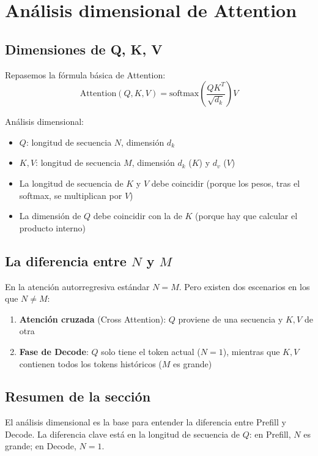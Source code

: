 \documentclass[a4paper]{article}
\begin{document}
\section{Análisis dimensional de Attention}

\subsection{Dimensiones de Q, K, V}

Repasemos la fórmula básica de Attention:
$$
\text{Attention}(Q, K, V) = \text{softmax}\left(\frac{QK^T}{\sqrt{d_k}}\right) V
$$

Análisis dimensional:
\begin{itemize}
  \item $Q$: longitud de secuencia $N$, dimensión $d_k$
  \item $K, V$: longitud de secuencia $M$, dimensión $d_k$ ($K$) y $d_v$ ($V$)
  \item La longitud de secuencia de $K$ y $V$ debe coincidir (porque los pesos, tras el softmax, se multiplican por $V$)
  \item La dimensión de $Q$ debe coincidir con la de $K$ (porque hay que calcular el producto interno)
\end{itemize}

\subsection{La diferencia entre $N$ y $M$}

En la atención autorregresiva estándar $N = M$. Pero existen dos escenarios en los que $N \neq M$:
\begin{enumerate}
  \item \textbf{Atención cruzada} (Cross Attention): $Q$ proviene de una secuencia y $K, V$ de otra
  \item \textbf{Fase de Decode}: $Q$ solo tiene el token actual ($N=1$), mientras que $K, V$ contienen todos los tokens históricos ($M$ es grande)
\end{enumerate}

\subsection{Resumen de la sección}

El análisis dimensional es la base para entender la diferencia entre Prefill y Decode. La diferencia clave está en la longitud de secuencia de $Q$: en Prefill, $N$ es grande; en Decode, $N = 1$.
\end{document}
